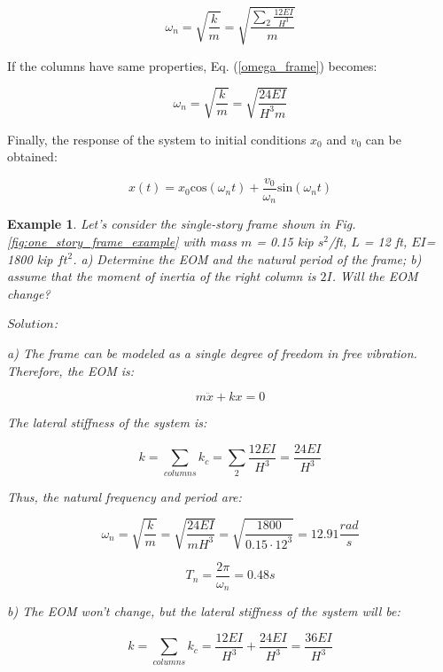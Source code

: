 \documentclass[12pt,letter]{article}
\newtheorem{ex}{Example}
\numberwithin{ex}{section} %
\newenvironment{example}{\begin{mdframed}[middlelinewidth=0.5mm]\begin{ex}\normalfont}{\end{ex}\end{mdframed}}
\numberwithin{re}{section} %
\begin{document}
\begin{equation} \label{omega_frame}
\omega_n = \sqrt{\frac{k}{m}} = \sqrt{\frac{\sum_{2}^{} \frac{12EI} {H^3}}{m}}
\end{equation}

If the columns have same properties, Eq. (\ref{omega_frame}) becomes:

\begin{equation}
\omega_n = \sqrt{\frac{k}{m}} = \sqrt{\frac{24EI}{H^3m}}
\end{equation}


Finally, the response of the system to initial conditions $x_0$ and ${v_0}$ can be obtained:

\begin{equation}
x(t) = x_0\text{cos}(\omega_n t) + \frac{v_0}{\omega_n}\text{sin}(\omega_n t)
\end{equation}	

\pagebreak


\begin{example}
	
Let's consider the single-story frame shown in Fig. \ref{fig:one_story_frame_example} with mass $m$ = 0.15 kip $s^2$/ft, $L$ = 12 ft, $EI$= 1800 kip $ft^2$. a) Determine the EOM and the natural period of the frame; b) assume that the moment of inertia of the right column is $2I$. Will the EOM change?

\vspace{1ex}

\noindent$Solution$:

\vspace{1ex}

a) The frame can be modeled as a single degree of freedom in free vibration. Therefore, the EOM is:

\begin{equation}
	m \ddot{x} + k x = 0
\end{equation}

The lateral stiffness of the system is:

\begin{equation}
k = \sum_{columns}^{} k_c = \sum_{2}^{} \frac{12EI} {H^3} = \frac{24 EI}{H^3}
\end{equation}

Thus, the natural frequency and period are:

\begin{equation}
\omega_n = \sqrt{\frac{k}{m}} = \sqrt{\frac{24 EI}{m H^3}} = \sqrt{\frac{1800}{0.15 \cdot 12^3}} = 12.91 \frac{rad}{s}
\end{equation}

\begin{equation}
T_n =\frac{2 \pi}{\omega_n} = 0.48 s
\end{equation}

b) The EOM won't change, but the lateral stiffness of the system will be: 

\begin{equation}
k = \sum_{columns}^{} k_c = \frac{12EI} {H^3} + \frac{24EI} {H^3} = \frac{36 EI}{H^3}
\end{equation}

	
\end{example}
\end{document}

